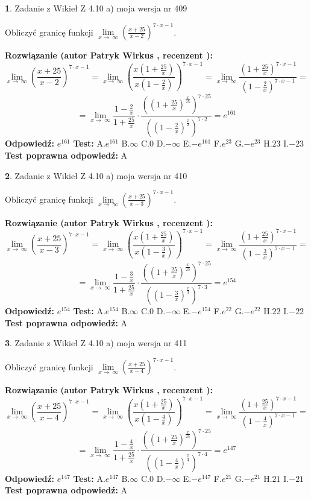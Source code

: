 \documentclass[12pt, a4paper]{article}
\theoremstyle{definition} %
\newtheorem{zad}{}
\newcommand{\zadStart}[1]{\begin{zad}#1\newline}
\newcommand{\zadStop}{\end{zad}}
\newcommand{\rozwStart}[2]{\noindent \textbf{Rozwiązanie (autor #1 , recenzent #2): }\newline}
\newcommand{\rozwStop}{\newline}
\newcommand{\odpStart}{\noindent \textbf{Odpowiedź:}\newline}
\newcommand{\odpStop}{\newline}
\newcommand{\testStart}{\noindent \textbf{Test:}\newline}
\newcommand{\testStop}{\newline}
\newcommand{\kluczStart}{\noindent \textbf{Test poprawna odpowiedź:}\newline}
\newcommand{\kluczStop}{\newline}
\begin{document}
\zadStart{Zadanie z Wikieł Z 4.10 a) moja wersja nr 409}

Obliczyć granicę funkcji  $\lim\limits_{x\to\ \infty}(\frac{x+25}{x-2})^{7\cdot x-1}$.
\zadStop
\rozwStart{Patryk Wirkus}{}
$$\lim\limits_{x\to\ \infty}(\frac{x+25}{x-2})^{7\cdot x-1} = \lim\limits_{x\to\ \infty}(\frac{x(1+\frac{25}{x})}{x(1-\frac{2}{x})})^{7\cdot x-1}=\lim\limits_{x\to\ \infty}\frac{(1+\frac{25}{x})^{7\cdot x-1}}{(1-\frac{2}{x})^{7\cdot x-1}}=$$
$$=\lim\limits_{x\to\ \infty}\frac{1-\frac{2}{x}}{1+\frac{25}{x}}\cdot\frac{((1+\frac{25}{x})^{\frac{x}{25}})^{7\cdot25}}{((1-\frac{2}{x})^{\frac{x}{2}})^{7\cdot2}}=e^{161}$$
\rozwStop
\odpStart
$e^{161}$
\odpStop
\testStart
A.$e^{161}$ B.$\infty$ C.$0$ D.$-\infty$ E.$-e^{161}$
F.$e^{23}$ G.$-e^{23}$
H.$23$
I.$-23$
\testStop
\kluczStart
A
\kluczStop



\zadStart{Zadanie z Wikieł Z 4.10 a) moja wersja nr 410}

Obliczyć granicę funkcji  $\lim\limits_{x\to\ \infty}(\frac{x+25}{x-3})^{7\cdot x-1}$.
\zadStop
\rozwStart{Patryk Wirkus}{}
$$\lim\limits_{x\to\ \infty}(\frac{x+25}{x-3})^{7\cdot x-1} = \lim\limits_{x\to\ \infty}(\frac{x(1+\frac{25}{x})}{x(1-\frac{3}{x})})^{7\cdot x-1}=\lim\limits_{x\to\ \infty}\frac{(1+\frac{25}{x})^{7\cdot x-1}}{(1-\frac{3}{x})^{7\cdot x-1}}=$$
$$=\lim\limits_{x\to\ \infty}\frac{1-\frac{3}{x}}{1+\frac{25}{x}}\cdot\frac{((1+\frac{25}{x})^{\frac{x}{25}})^{7\cdot25}}{((1-\frac{3}{x})^{\frac{x}{3}})^{7\cdot3}}=e^{154}$$
\rozwStop
\odpStart
$e^{154}$
\odpStop
\testStart
A.$e^{154}$ B.$\infty$ C.$0$ D.$-\infty$ E.$-e^{154}$
F.$e^{22}$ G.$-e^{22}$
H.$22$
I.$-22$
\testStop
\kluczStart
A
\kluczStop



\zadStart{Zadanie z Wikieł Z 4.10 a) moja wersja nr 411}

Obliczyć granicę funkcji  $\lim\limits_{x\to\ \infty}(\frac{x+25}{x-4})^{7\cdot x-1}$.
\zadStop
\rozwStart{Patryk Wirkus}{}
$$\lim\limits_{x\to\ \infty}(\frac{x+25}{x-4})^{7\cdot x-1} = \lim\limits_{x\to\ \infty}(\frac{x(1+\frac{25}{x})}{x(1-\frac{4}{x})})^{7\cdot x-1}=\lim\limits_{x\to\ \infty}\frac{(1+\frac{25}{x})^{7\cdot x-1}}{(1-\frac{4}{x})^{7\cdot x-1}}=$$
$$=\lim\limits_{x\to\ \infty}\frac{1-\frac{4}{x}}{1+\frac{25}{x}}\cdot\frac{((1+\frac{25}{x})^{\frac{x}{25}})^{7\cdot25}}{((1-\frac{4}{x})^{\frac{x}{4}})^{7\cdot4}}=e^{147}$$
\rozwStop
\odpStart
$e^{147}$
\odpStop
\testStart
A.$e^{147}$ B.$\infty$ C.$0$ D.$-\infty$ E.$-e^{147}$
F.$e^{21}$ G.$-e^{21}$
H.$21$
I.$-21$
\testStop
\kluczStart
A
\kluczStop
\end{document}
